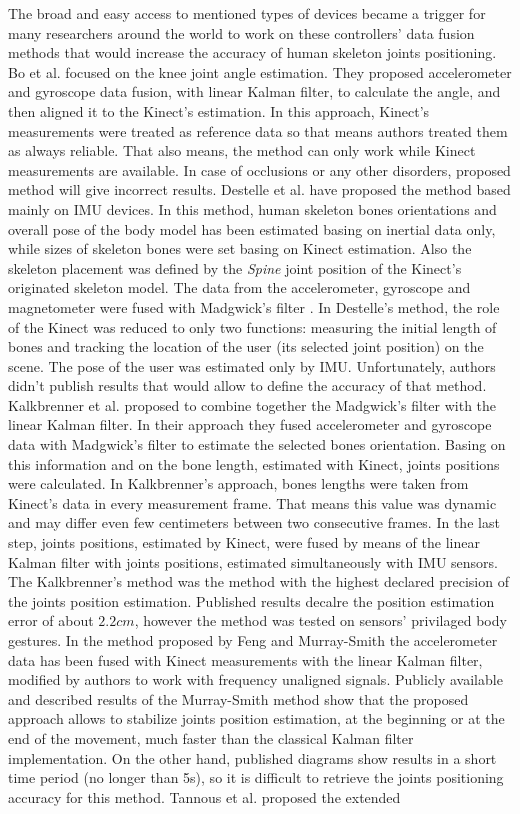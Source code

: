 \documentclass[sensors,article,submit,moreauthors,pdftex,10pt,a4paper]{mdpi}
\begin{document}
The broad and easy access to mentioned types of devices became a trigger for many researchers around the world to work on these controllers' data fusion methods that would increase the accuracy of human skeleton joints positioning. Bo et al. \cite{Bo2011a} focused on the knee joint angle estimation. They proposed accelerometer and gyroscope data fusion, with linear Kalman filter, to calculate the angle, and then aligned it to the Kinect’s estimation. In this approach, Kinect's measurements were treated as reference data so that means authors treated them as always reliable. That also means, the method can only work while Kinect measurements are available. In case of occlusions or any other disorders, proposed method will give incorrect results. Destelle et al. \cite{Destelle2014} have proposed the method based mainly on IMU devices. In this method, human skeleton bones orientations and overall pose of the body model has been estimated basing on inertial data only, while sizes of  skeleton bones were set basing on Kinect estimation. Also the skeleton placement was defined by the \emph{Spine} joint position of the Kinect's originated skeleton model. The data from the accelerometer, gyroscope and magnetometer were fused with Madgwick’s filter \cite{Madgwick2011}. In Destelle's method, the role of the Kinect was reduced to only two functions: measuring the initial length of bones and tracking the location of the user (its selected joint position) on the scene. The pose of the user was estimated only by IMU. Unfortunately, authors didn't publish results that would allow to define the accuracy of that method. Kalkbrenner et al. \cite{Kalkbrenner2014} proposed to combine together the Madgwick’s filter with the linear Kalman filter. In their approach they fused accelerometer and gyroscope data with Madgwick’s filter to estimate the selected bones orientation. Basing on this information and on the bone length, estimated with Kinect, joints positions were calculated. In Kalkbrenner's approach, bones lengths were taken from Kinect's data in every measurement frame. That means this value was dynamic and may differ even few centimeters between two consecutive frames. In the last step, joints positions, estimated by Kinect, were fused by means of the linear Kalman filter with joints positions, estimated simultaneously with IMU sensors. The Kalkbrenner's method was the method with the highest declared precision of the joints position estimation. Published results decalre the position estimation error of about $2.2cm$, however the method was tested on sensors' privilaged body gestures. In the method proposed by Feng and Murray-Smith \cite{Murray-Smith2014} the accelerometer data has been fused with Kinect measurements with the linear Kalman filter, modified by authors to work with frequency unaligned signals. Publicly available and described results of the Murray-Smith method show that the proposed approach allows to stabilize joints position estimation, at the beginning or at the end of the movement, much faster than the classical Kalman filter implementation. On the other hand, published diagrams show results in a short time period (no longer than 5s), so it is difficult to retrieve the joints positioning accuracy for this method. Tannous et al. \cite{Tannous2016} proposed the extended 
\end{document}
